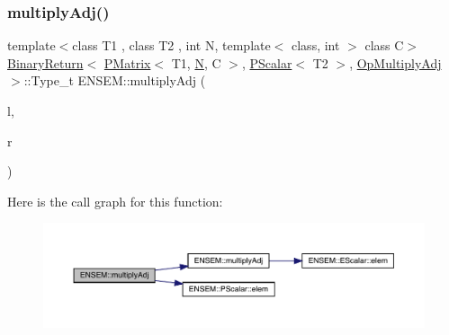 \subsubsection{\texorpdfstring{multiplyAdj()}{multiplyAdj()}\hspace{0.1cm}{\footnotesize\ttfamily [1/3]}}
{\footnotesize\ttfamily template$<$class T1 , class T2 , int N, template$<$ class, int $>$ class C$>$ \\
\mbox{\hyperlink{structENSEM_1_1BinaryReturn}{Binary\+Return}}$<$ \mbox{\hyperlink{classENSEM_1_1PMatrix}{P\+Matrix}}$<$ T1, \mbox{\hyperlink{adat__devel_2lib_2hadron_2operator__name__util_8cc_a7722c8ecbb62d99aee7ce68b1752f337}{N}}, C $>$, \mbox{\hyperlink{classENSEM_1_1PScalar}{P\+Scalar}}$<$ T2 $>$, \mbox{\hyperlink{structENSEM_1_1OpMultiplyAdj}{Op\+Multiply\+Adj}} $>$\+::Type\+\_\+t E\+N\+S\+E\+M\+::multiply\+Adj (\begin{DoxyParamCaption}\item[{const \mbox{\hyperlink{classENSEM_1_1PMatrix}{P\+Matrix}}$<$ T1, \mbox{\hyperlink{adat__devel_2lib_2hadron_2operator__name__util_8cc_a7722c8ecbb62d99aee7ce68b1752f337}{N}}, C $>$ \&}]{l,  }\item[{const \mbox{\hyperlink{classENSEM_1_1PScalar}{P\+Scalar}}$<$ T2 $>$ \&}]{r }\end{DoxyParamCaption})\hspace{0.3cm}{\ttfamily [inline]}}

Here is the call graph for this function\+:\nopagebreak
\begin{figure}[H]
\begin{center}
\leavevmode
\includegraphics[width=350pt]{df/d0a/group__primmatrix_ga1635949cdf21523d1c8bdb6d5ada65a8_cgraph}
\end{center}
\end{figure}
\mbox{\label{group__primmatrix_ga500e40c33d8e7e4a2a95970fb8a56326}} 
